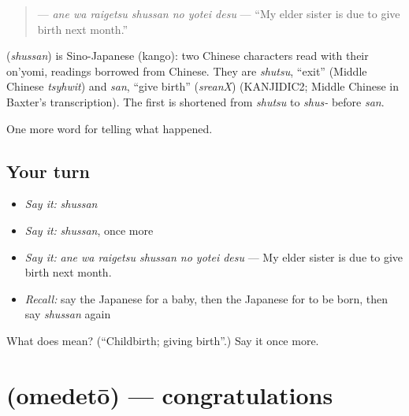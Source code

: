\begin{quote}
\textbf{   } — \emph{ane wa raigetsu shussan no yotei desu} — \textquotedblleft{}My elder sister is due to give birth next month.\textquotedblright{}
\end{quote}

\begin{cousinweb}
\textbf{} (\emph{shussan}) is Sino-Japanese (kango): two Chinese characters read with their on'yomi, readings borrowed from Chinese. They are \emph{shutsu}, \textquotedblleft{}exit\textquotedblright{} (Middle Chinese \emph{tsyhwit}) and \emph{san}, \textquotedblleft{}give birth\textquotedblright{} (\emph{sreanX}) (KANJIDIC2; Middle Chinese in Baxter's transcription). The first is shortened from \emph{shutsu} to \emph{shus-} before \emph{san}.
\end{cousinweb}

\begin{grammarlens}[title={What you've built}]
One more word for telling what happened.
\end{grammarlens}

\subsection*{Your turn}
\begin{itemize}
\raggedright
  \item \emph{Say it:} \emph{shussan}
  \item \emph{Say it:} \emph{shussan}, once more
  \item \emph{Say it:} \emph{ane wa raigetsu shussan no yotei desu} — My elder sister is due to give birth next month.
  \item \emph{Recall:} say the Japanese for a baby, then the Japanese for to be born, then say \emph{shussan} again
\end{itemize}

\begin{tcolorbox}[breakable,colback=teal!4,colframe=teal!35!black,title={Before you move on}]
What does  mean? (\textquotedblleft{}Childbirth; giving birth\textquotedblright{}.) Say it once more.
\end{tcolorbox}
\section[\texorpdfstring{\ja{おめでとう} (omedetō)}{おめでとう (omedetō)}]{ (omedetō) — congratulations}

